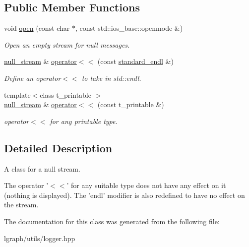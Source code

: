 \subsection*{Public Member Functions}
\begin{DoxyCompactItemize}
\item 
\hypertarget{classlgraph_1_1utils_1_1null__stream_a4b1d2687e779efef7d4995bcede83448}{void \hyperlink{classlgraph_1_1utils_1_1null__stream_a4b1d2687e779efef7d4995bcede83448}{open} (const char $\ast$, const std\-::ios\-\_\-base\-::openmode \&)}\label{classlgraph_1_1utils_1_1null__stream_a4b1d2687e779efef7d4995bcede83448}

\begin{DoxyCompactList}\small\item\em Open an empty stream for null messages. \end{DoxyCompactList}\item 
\hypertarget{classlgraph_1_1utils_1_1null__stream_a6dd6b8cde39e03fe63eb2feef89ebc11}{\hyperlink{classlgraph_1_1utils_1_1null__stream}{null\-\_\-stream} \& \hyperlink{classlgraph_1_1utils_1_1null__stream_a6dd6b8cde39e03fe63eb2feef89ebc11}{operator$<$$<$} (const \hyperlink{classlgraph_1_1utils_1_1null__stream_ad5453d44dda5265d0075dbe394df4618}{standard\-\_\-endl} \&)}\label{classlgraph_1_1utils_1_1null__stream_a6dd6b8cde39e03fe63eb2feef89ebc11}

\begin{DoxyCompactList}\small\item\em Define an operator$<$$<$ to take in std\-::endl. \end{DoxyCompactList}\item 
\hypertarget{classlgraph_1_1utils_1_1null__stream_a633f62bff5dd6e4973674d2f109732cf}{{\footnotesize template$<$class t\-\_\-printable $>$ }\\\hyperlink{classlgraph_1_1utils_1_1null__stream}{null\-\_\-stream} \& \hyperlink{classlgraph_1_1utils_1_1null__stream_a633f62bff5dd6e4973674d2f109732cf}{operator$<$$<$} (const t\-\_\-printable \&)}\label{classlgraph_1_1utils_1_1null__stream_a633f62bff5dd6e4973674d2f109732cf}

\begin{DoxyCompactList}\small\item\em operator$<$$<$ for any printable type. \end{DoxyCompactList}\end{DoxyCompactItemize}


\subsection{Detailed Description}
A class for a null stream. 

The operator '$<$$<$' for any suitable type does not have any effect on it (nothing is displayed). The 'endl' modifier is also redefined to have no effect on the stream. 

The documentation for this class was generated from the following file\-:\begin{DoxyCompactItemize}
\item 
lgraph/utils/logger.\-hpp\end{DoxyCompactItemize}
